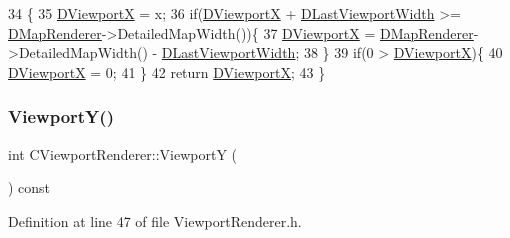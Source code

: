 \begin{DoxyCode}
34                                      \{
35     \hyperlink{classCViewportRenderer_aea9e05347f71a8e6b83439aab653be18}{DViewportX} = x;
36     \textcolor{keywordflow}{if}(\hyperlink{classCViewportRenderer_aea9e05347f71a8e6b83439aab653be18}{DViewportX} + \hyperlink{classCViewportRenderer_aaa21acd1b43badc3c1a3b0bf9b0f86f9}{DLastViewportWidth} >= 
      \hyperlink{classCViewportRenderer_ac6bc7771bd6dcd35107d25bebb0c0a4c}{DMapRenderer}->DetailedMapWidth())\{
37         \hyperlink{classCViewportRenderer_aea9e05347f71a8e6b83439aab653be18}{DViewportX} = \hyperlink{classCViewportRenderer_ac6bc7771bd6dcd35107d25bebb0c0a4c}{DMapRenderer}->DetailedMapWidth() - 
      \hyperlink{classCViewportRenderer_aaa21acd1b43badc3c1a3b0bf9b0f86f9}{DLastViewportWidth};
38     \}
39     \textcolor{keywordflow}{if}(0 > \hyperlink{classCViewportRenderer_aea9e05347f71a8e6b83439aab653be18}{DViewportX})\{
40         \hyperlink{classCViewportRenderer_aea9e05347f71a8e6b83439aab653be18}{DViewportX} = 0;
41     \}
42     \textcolor{keywordflow}{return} \hyperlink{classCViewportRenderer_aea9e05347f71a8e6b83439aab653be18}{DViewportX};
43 \}
\end{DoxyCode}
\hypertarget{classCViewportRenderer_add3d4da286927abe2f19fbb37fd42ed5}{}\label{classCViewportRenderer_add3d4da286927abe2f19fbb37fd42ed5} 
\subsubsection{\texorpdfstring{Viewport\+Y()}{ViewportY()}\hspace{0.1cm}{\footnotesize\ttfamily [1/2]}}
{\footnotesize\ttfamily int C\+Viewport\+Renderer\+::\+ViewportY (\begin{DoxyParamCaption}{ }\end{DoxyParamCaption}) const\hspace{0.3cm}{\ttfamily [inline]}}



Definition at line 47 of file Viewport\+Renderer.\+h.


